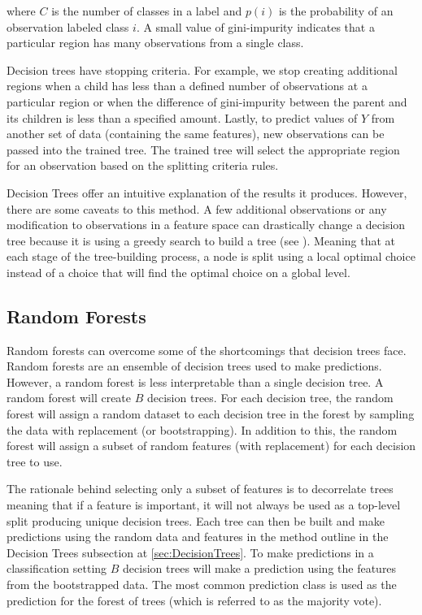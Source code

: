 \noindent where \(C\) is the number of classes in a label and \(p(i)\) is the probability of an observation labeled class \(i\).  A small value of gini-impurity indicates that a particular region has many observations from a single class. 

Decision trees have stopping criteria.  For example, we stop creating additional regions when a child has less than a defined number of observations at a particular region or when the difference of gini-impurity between the parent and its children is less than a specified amount.  Lastly, to predict values of \(Y\) from another set of data (containing the same features), new observations can be passed into the trained tree.  The trained tree will select the appropriate region for an observation based on the splitting criteria rules. 

Decision Trees offer an intuitive explanation of the results it produces. However, there are some caveats to this method.  A few additional observations or any modification to observations in a feature space can drastically change a decision tree because it is using a greedy search to build a tree (see \cite{koning2017decision}). Meaning that at each stage of the tree-building process, a node is split using a local optimal choice instead of a choice that will find the optimal choice on a global level. 

\subsection{Random Forests} \label{sec:RandomForest}

Random forests can overcome some of the shortcomings that decision trees face.  Random forests are an ensemble of decision trees used to make predictions. However, a random forest is less interpretable than a single decision tree.  A random forest will create \(B\) decision trees.  For each decision tree,  the random forest will assign a random dataset to each decision tree in the forest by sampling the data with replacement (or bootstrapping). In addition to this, the random forest will assign a subset of random features (with replacement) for each decision tree to use. 
 
The rationale behind selecting only a subset of features is to decorrelate trees meaning that if a feature is important, it will not always be used as a top-level split producing unique decision trees. Each tree can then be built and make predictions using the random data and features in the method outline in the Decision Trees subsection at \ref{sec:DecisionTrees}. To make predictions in a classification setting \(B\) decision trees will make a prediction using the features from the bootstrapped data. The most common prediction class is used as the prediction for the forest of trees (which is referred to as the majority vote).

